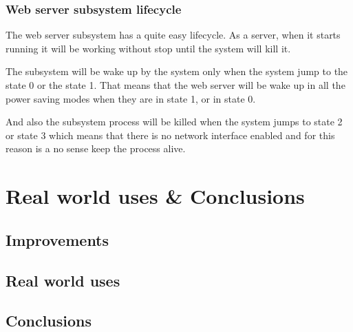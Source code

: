 	\subsection{Web server subsystem lifecycle} %
	The web server subsystem has a quite easy lifecycle. As a server, when it starts running it will be working without stop until the system will kill it. 

	The subsystem will be wake up by the system only when the system jump to the state 0 or the state 1. That means that the web server will be wake up in all the power saving modes when they are in state 1, or in state 0.

	And also the subsystem process will be killed when the system jumps to state 2 or state 3 which means that there is no network interface enabled and for this reason is a no sense keep the process alive.

\chapter{Real world uses \& Conclusions}
	\section{Improvements}
	\section{Real world uses}
	\section{Conclusions}




